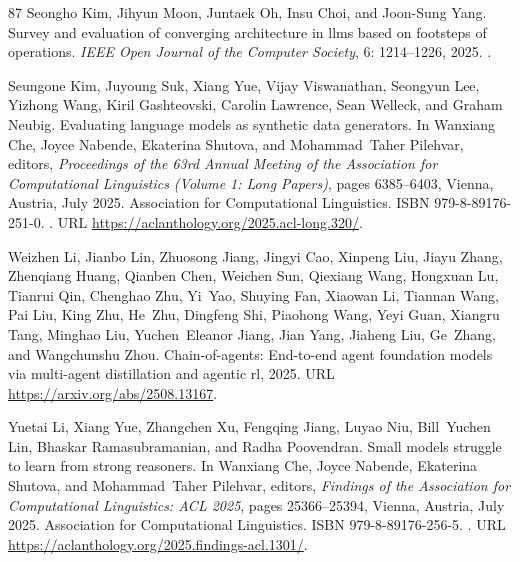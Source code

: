 \begin{thebibliography}{87}
Seongho Kim, Jihyun Moon, Juntaek Oh, Insu Choi, and Joon-Sung Yang.
\newblock Survey and evaluation of converging architecture in llms based on footsteps of operations.
\newblock \emph{IEEE Open Journal of the Computer Society}, 6: 1214--1226, 2025{}.
\newblock {}.

Seungone Kim, Juyoung Suk, Xiang Yue, Vijay Viswanathan, Seongyun Lee, Yizhong Wang, Kiril Gashteovski, Carolin Lawrence, Sean Welleck, and Graham Neubig.
\newblock Evaluating language models as synthetic data generators.
\newblock In Wanxiang Che, Joyce Nabende, Ekaterina Shutova, and Mohammad~Taher Pilehvar, editors, \emph{Proceedings of the 63rd Annual Meeting of the Association for Computational Linguistics (Volume 1: Long Papers)}, pages 6385--6403, Vienna, Austria, July 2025{}. Association for Computational Linguistics.
\newblock ISBN 979-8-89176-251-0.
\newblock {}.
\newblock URL \url{https://aclanthology.org/2025.acl-long.320/}.

Weizhen Li, Jianbo Lin, Zhuosong Jiang, Jingyi Cao, Xinpeng Liu, Jiayu Zhang, Zhenqiang Huang, Qianben Chen, Weichen Sun, Qiexiang Wang, Hongxuan Lu, Tianrui Qin, Chenghao Zhu, Yi~Yao, Shuying Fan, Xiaowan Li, Tiannan Wang, Pai Liu, King Zhu, He~Zhu, Dingfeng Shi, Piaohong Wang, Yeyi Guan, Xiangru Tang, Minghao Liu, Yuchen~Eleanor Jiang, Jian Yang, Jiaheng Liu, Ge~Zhang, and Wangchunshu Zhou.
\newblock Chain-of-agents: End-to-end agent foundation models via multi-agent distillation and agentic rl, 2025{}.
\newblock URL \url{https://arxiv.org/abs/2508.13167}.

Yuetai Li, Xiang Yue, Zhangchen Xu, Fengqing Jiang, Luyao Niu, Bill~Yuchen Lin, Bhaskar Ramasubramanian, and Radha Poovendran.
\newblock Small models struggle to learn from strong reasoners.
\newblock In Wanxiang Che, Joyce Nabende, Ekaterina Shutova, and Mohammad~Taher Pilehvar, editors, \emph{Findings of the Association for Computational Linguistics: ACL 2025}, pages 25366--25394, Vienna, Austria, July 2025{}. Association for Computational Linguistics.
\newblock ISBN 979-8-89176-256-5.
\newblock {}.
\newblock URL \url{https://aclanthology.org/2025.findings-acl.1301/}.


\end{thebibliography}
